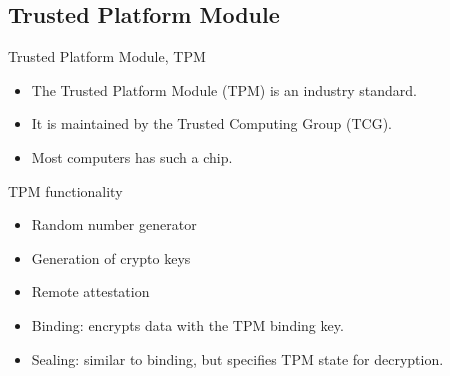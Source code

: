 \subsection{Trusted Platform Module}

\begin{frame}
  \begin{block}{Trusted Platform Module, TPM}
    \begin{itemize}
      \item The Trusted Platform Module (TPM) is an industry standard.
      \item It is maintained by the Trusted Computing Group (TCG).
      \item Most computers has such a chip.
    \end{itemize}
  \end{block}
\end{frame}

\begin{frame}
  \begin{block}{TPM functionality}
    \begin{itemize}
      \item Random number generator
      \item Generation of crypto keys
      \item Remote attestation
      \item Binding: encrypts data with the TPM binding key.
      \item Sealing: similar to binding, but specifies TPM state for 
        decryption.
    \end{itemize}
  \end{block}
\end{frame}

